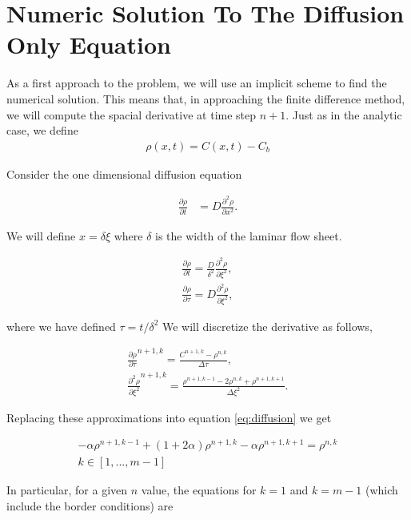 \section{Numeric Solution To The Diffusion Only Equation}


As a first approach to the problem, we will use an implicit scheme to find the numerical solution. This means that, in approaching the finite difference method, we will compute the spacial derivative at time step $n+1$. 
Just as in the analytic case, we define
\begin{align}
	\rho(x,t) = C(x,t) - C_b
\end{align}

Consider the one dimensional diffusion equation

\begin{align}
\frac{\partial \rho}{\partial t} &= D \frac{\partial^2 \rho}{\partial x^2}.
\label{eq:diffusion}
\end{align}

We will define $x = \delta \xi$ where $\delta$ is the width of the laminar flow sheet. 

\begin{align}
\frac{\partial \rho}{\partial t} = \frac{D}{\delta^2} \frac{\partial^2 \rho}{\partial \xi^2},\\
\frac{\partial \rho}{\partial \tau} =  D \frac{\partial^2 \rho}{\partial \xi^2},
\end{align}

where we have defined $\tau = t/\delta^2$
We will discretize the derivative as follows,

\begin{align}
\frac{\partial \rho}{\partial \tau}^{n+1, k}= \frac{C^{n+1, k}-\rho^{n, k}}{\Delta \tau},\\
\frac{\partial^2 \rho}{\partial \xi^2}^{n+1, k} = \frac{\rho^{n+1, k-1}-2\rho^{n, k}+\rho^{n+1, k+1}}{\Delta \xi^2}.
\end{align}

Replacing these approximations into equation \ref{eq:diffusion} we get

\begin{align}
    -\alpha \rho^{n+1,k-1} + ( 1 + 2\alpha ) \rho^{n+1,k} -\alpha \rho^{n+1,k+1} =  \rho^{n,k}\\
    k \in [1, ... , m-1]
    \label{eq:equations-n}
\end{align}

In particular, for a given $n$ value,  the equations for $k=1$ and $k=m-1$ (which include the border conditions) are

